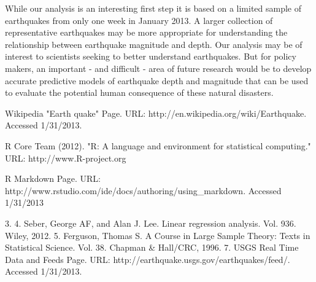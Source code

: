 \documentclass[a4paper,14pt]{extarticle}
\begin{document}
While our analysis is an interesting first step it is based on a limited sample of earthquakes from only one week in January 2013. A larger collection of representative earthquakes may be more appropriate for understanding the relationship between earthquake magnitude and depth. Our analysis may be of interest to scientists seeking to better understand earthquakes. But for policy makers, an important - and difficult - area of future research would be to develop accurate predictive models of earthquake depth and magnitude that can be used to evaluate the potential human consequence of these natural disasters.


\newpage


\begin{thebibliography}{9}

 Wikipedia "Earth quake" Page. URL:
  http://en.wikipedia.org/wiki/Earthquake. Accessed 1/31/2013.

  R Core Team (2012). "R: A language and environment for statistical computing." URL: http://www.R-project.org

  R Markdown Page. URL: http://www.rstudio.com/ide/docs/authoring/using\_markdown. Accessed 1/31/2013


\end{thebibliography}

3. 
4. Seber, George AF, and Alan J. Lee. Linear regression analysis. Vol. 936. Wiley, 2012.
5. Ferguson, Thomas S. A Course in Large Sample Theory: Texts in Statistical Science. Vol. 38. Chapman \& Hall/CRC, 1996.
7. USGS Real Time Data and Feeds Page. URL: http://earthquake.usgs.gov/earthquakes/feed/. Accessed 1/31/2013.
\end{document}
